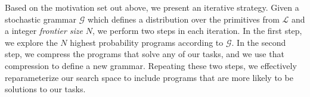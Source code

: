 \documentclass{article}
\DeclareMathOperator*{\argmax}{arg\,max}
\begin{document}







Based on the motivation set out above, we present an iterative
strategy. Given a stochastic grammar $\mathcal{G}$ which defines a
distribution over the primitives from $\mathcal{L}$ and a integer
\emph{frontier size} $N$, we perform two steps in each iteration.  In
the first step, we explore the $N$ highest probability programs
according to $\mathcal{G}$. In the second step, we compress the
programs that solve any of our tasks, and we use that compression to
define a new grammar. Repeating these two steps, we effectively
reparameterize our search space to include programs that are more likely
to be solutions to our tasks. 
\end{document}
